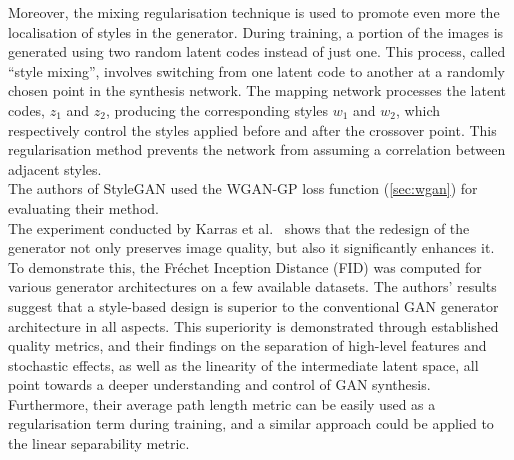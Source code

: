 \noindent Moreover, the mixing regularisation technique is used to promote even more the localisation of styles in the generator. During training, a portion of the images is generated using two random latent codes instead of just one. This process, called “style mixing”, involves switching from one latent code to another at a randomly chosen point in the synthesis network. The mapping network processes the latent codes, $z_1$ and $z_2$, producing the corresponding styles $w_1$ and $w_2$, which respectively control the styles applied before and after the crossover point. This regularisation method prevents the network from assuming a correlation between adjacent styles. \\
%
The authors of StyleGAN used the WGAN-GP loss function (\ref{sec:wgan}) for evaluating their method.\\
\noindent The experiment conducted by Karras et al.~\cite{StyleGAN} shows that the redesign of the generator not only preserves image quality, but also it significantly enhances it. To demonstrate this, the Fréchet Inception Distance (FID) was computed for various generator architectures on a few available datasets.
The authors' results suggest that a style-based design is superior to the conventional GAN generator architecture in all aspects. This superiority is demonstrated through established quality metrics, and their findings on the separation of high-level features and stochastic effects, as well as the linearity of the intermediate latent space, all point towards a deeper understanding and control of GAN synthesis.
Furthermore, their average path length metric can be easily used as a regularisation term during training, and a similar approach could be applied to the linear separability metric.

